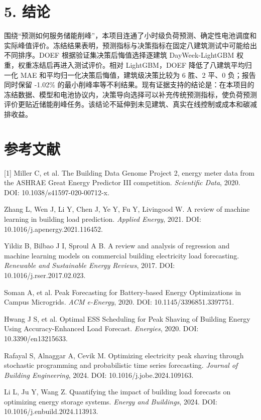 \documentclass[12pt,a4paper]{article}
\begin{document}
\section{5. 结论}
围绕“预测如何服务储能削峰”，本项目连通了小时级负荷预测、确定性电池调度和实际峰值评价。冻结结果表明，预测指标与决策指标在固定八建筑测试中可能给出不同排序。DOEF 根据验证集决策后悔值选择逐建筑 DayWeek-LightGBM 权重，权重冻结后再进入测试评价。相对 LightGBM，DOEF 降低了八建筑平均归一化 MAE 和平均归一化决策后悔值，建筑级决策比较为 6 胜、2 平、0 负；报告同时保留 -1.02\% 的最小削峰率等不利结果。现有证据支持的结论是：在本项目的冻结数据、模型和电池协议内，决策导向选择可以补充传统预测指标，使负荷预测评价更贴近储能削峰任务。该结论不延伸到未见建筑、真实在线控制或成本和碳减排收益。\par
\fontsize{10.5}{20}\selectfont
\section{参考文献}
[1] Miller C, et al. The Building Data Genome Project 2, energy meter data from the ASHRAE Great Energy Predictor III competition. \textit{Scientific Data}, 2020. DOI: 10.1038/s41597-020-00712-x.\par
[2] Zhang L, Wen J, Li Y, Chen J, Ye Y, Fu Y, Livingood W. A review of machine learning in building load prediction. \textit{Applied Energy}, 2021. DOI: 10.1016/j.apenergy.2021.116452.\par
[3] Yildiz B, Bilbao J I, Sproul A B. A review and analysis of regression and machine learning models on commercial building electricity load forecasting. \textit{Renewable and Sustainable Energy Reviews}, 2017. DOI: 10.1016/j.rser.2017.02.023.\par
[4] Soman A, et al. Peak Forecasting for Battery-based Energy Optimizations in Campus Microgrids. \textit{ACM e-Energy}, 2020. DOI: 10.1145/3396851.3397751.\par
[5] Hwang J S, et al. Optimal ESS Scheduling for Peak Shaving of Building Energy Using Accuracy-Enhanced Load Forecast. \textit{Energies}, 2020. DOI: 10.3390/en13215633.\par
[6] Rafayal S, Alnaggar A, Cevik M. Optimizing electricity peak shaving through stochastic programming and probabilistic time series forecasting. \textit{Journal of Building Engineering}, 2024. DOI: 10.1016/j.jobe.2024.109163.\par
[7] Li L, Ju Y, Wang Z. Quantifying the impact of building load forecasts on optimizing energy storage systems. \textit{Energy and Buildings}, 2024. DOI: 10.1016/j.enbuild.2024.113913.\par
\end{document}
